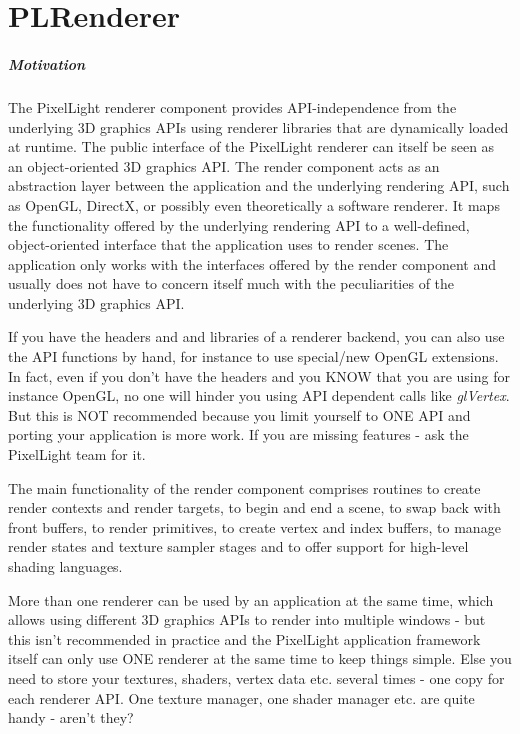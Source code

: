 \chapter{PLRenderer}


\paragraph{Motivation}
The PixelLight renderer component provides API-independence from the underlying 3D graphics APIs using renderer libraries that are dynamically loaded at runtime. The public interface of the PixelLight renderer can itself be seen as an object-oriented 3D graphics API. The render component acts as an abstraction layer between the application and the underlying rendering API, such as OpenGL, DirectX, or possibly even theoretically a software renderer. It maps the functionality offered by the underlying rendering API to a well-defined, object-oriented interface that the application uses to render scenes. The application only works with the interfaces offered by the render component and usually does not have to concern itself much with the peculiarities of the underlying 3D graphics API.

If you have the headers and and libraries of a renderer backend, you can also use the API functions by hand, for instance to use special/new OpenGL extensions. In fact, even if you don't have the headers and you KNOW that you are using for instance OpenGL, no one will hinder you using API dependent calls like \emph{glVertex}. But this is NOT recommended because you limit yourself to ONE API and porting your application is more work. If you are missing features - ask the PixelLight team for it.

The main functionality of the render component comprises routines to create render contexts and render targets, to begin and end a scene, to swap back with front buffers, to render primitives, to create vertex and index buffers, to manage render states and texture sampler stages and to offer support for high-level shading languages.

More than one renderer can be used by an application at the same time, which allows using different 3D graphics APIs to render into multiple windows - but this isn't recommended in practice and the PixelLight application framework itself can only use ONE renderer at the same time to keep things simple. Else you need to store your textures, shaders, vertex data etc. several times - one copy for each renderer API. One texture manager, one shader manager etc. are quite handy - aren't they?

